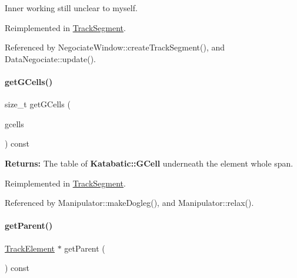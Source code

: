 Inner working still unclear to myself. 

Reimplemented in \hyperlink{classKite_1_1TrackSegment_af2d46d64cbd02bdbba53d5483d95e26d}{Track\+Segment}.



Referenced by Negociate\+Window\+::create\+Track\+Segment(), and Data\+Negociate\+::update().

\mbox{\label{classKite_1_1TrackElement_af45301f76558f613ccb605a8f851080e}} 
\paragraph{\texorpdfstring{get\+G\+Cells()}{getGCells()}}
{\footnotesize\ttfamily size\+\_\+t get\+G\+Cells (\begin{DoxyParamCaption}\item[{Katabatic\+::\+G\+Cell\+Vector \&}]{gcells }\end{DoxyParamCaption}) const\hspace{0.3cm}{\ttfamily [virtual]}}

{\bfseries Returns\+:} The table of \textbf{ Katabatic\+::\+G\+Cell} underneath the element whole span. 

Reimplemented in \hyperlink{classKite_1_1TrackSegment_af45301f76558f613ccb605a8f851080e}{Track\+Segment}.



Referenced by Manipulator\+::make\+Dogleg(), and Manipulator\+::relax().

\mbox{\label{classKite_1_1TrackElement_a95ec3b8e7e1ec87c20ee0b37bcc96df7}} 
\paragraph{\texorpdfstring{get\+Parent()}{getParent()}}
{\footnotesize\ttfamily \hyperlink{classKite_1_1TrackElement}{Track\+Element} $\ast$ get\+Parent (\begin{DoxyParamCaption}{ }\end{DoxyParamCaption}) const\hspace{0.3cm}{\ttfamily [virtual]}}


